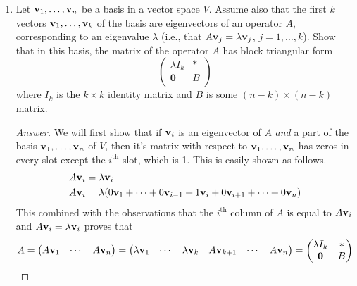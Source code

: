 \documentclass[../psets.tex]{subfiles}
\begin{document}
\begin{enumerate}[label={\textbf{1.\arabic*.}}]
\begin{proof}[Answer]
\begin{align*}
        \end{align*}
        as desired.
    \end{proof}
    \item Let $\mathbf{v}_1,\dots,\mathbf{v}_n$ be a basis in a vector space $V$. Assume also that the first $k$ vectors $\mathbf{v}_1,\dots,\mathbf{v}_k$ of the basis are eigenvectors of an operator $A$, corresponding to an eigenvalue $\lambda$ (i.e., that $A\mathbf{v}_j=\lambda\mathbf{v}_j$, $j=1,\dots,k$). Show that in this basis, the matrix of the operator $A$ has block triangular form
    \begin{equation*}
        \begin{pmatrix}
            \lambda I_k & *\\
            \bm{0} & B\\
        \end{pmatrix}
    \end{equation*}
    where $I_k$ is the $k\times k$ identity matrix and $B$ is some $(n-k)\times(n-k)$ matrix.
    \begin{proof}[Answer]
        We will first show that if $\mathbf{v}_i$ is an eigenvector of $A$ \emph{and} a part of the basis $\mathbf{v}_1,\dots,\mathbf{v}_n$ of $V$, then it's matrix with respect to $\mathbf{v}_1,\dots,\mathbf{v}_n$ has zeros in every slot except the $i^\text{th}$ slot, which is 1. This is easily shown as follows.
        \begin{align*}
            A\mathbf{v}_i &= \lambda\mathbf{v}_i\\
            A\mathbf{v}_i &= \lambda(0\mathbf{v}_1+\cdots+0\mathbf{v}_{i-1}+1\mathbf{v}_i+0\mathbf{v}_{i+1}+\cdots+0\mathbf{v}_n)
        \end{align*}
        This combined with the observations that the $i^\text{th}$ column of $A$ is equal to $A\mathbf{v}_i$ and $A\mathbf{v}_i=\lambda\mathbf{v}_i$ proves that
        \begin{equation*}
            A =
            \begin{pmatrix}
                A\vm_1 & \cdots & A\vm_n\\
            \end{pmatrix}
            =
            \begin{pmatrix}
                \lambda\vm_1 & \cdots & \lambda\vm_k & A\vm_{k+1} & \cdots & A\vm_n\\
            \end{pmatrix}
            =
            \begin{pmatrix}
                \lambda I_k & *\\
                \bm{0} & B\\
            \end{pmatrix}

\end{equation*}
\end{proof}
\end{enumerate}
\end{document}
